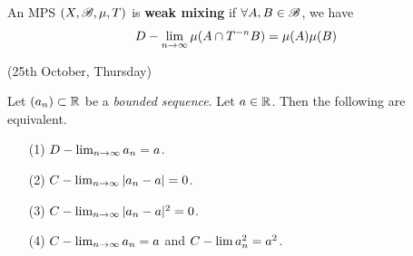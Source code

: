\documentclass[10pt,a4paper]{report}
\begin{document}
 An MPS $(X,\mathscr{B}, \mu, T)$ is \textbf{weak mixing} if $\forall A,B \in \mathscr{B}$, we have
\begin{align*}
D-\lim_{n\rightarrow \infty} \mu(A \cap T^{-n}B) = \mu(A) \mu(B)
\end{align*}
\s

\newday

(25th October, Thursday)
\s

\lem Let $(a_n) \subset \mathbb{R}$ be a \emph{bounded sequence}. Let $a\in \mathbb{R}$. Then the following are equivalent.
\begin{itemize}
\item[(1)] $D-\lim_{n\rightarrow \infty} a_n =a$.
\item[(2)] $C-\lim_{n\rightarrow \infty} |a_n -a| =0$.
\item[(3)] $C-\lim_{n\rightarrow \infty} |a_n -a|^2 =0$.
\item[(4)] $C-\lim_{n\rightarrow \infty} a_n =a$ and $C-\lim a_n^2 =a^2$.
\end{itemize}
\end{document}
